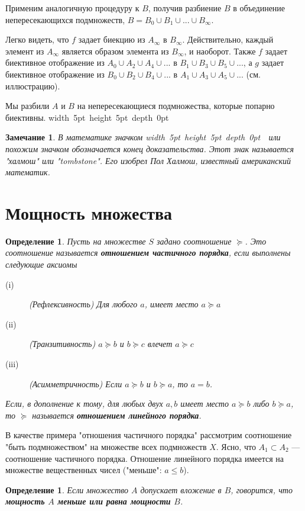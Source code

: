 \documentclass[12pt]{book}
\def\endproof{\hbox{\vrule width 5pt height 5pt depth 0pt}}
\theoremstyle{upshape}
\newtheorem{zadacha}{Задача}[chapter]
\theoremstyle{generic}
\newtheorem{opredelenie}[teorema]{Определение}
\newtheorem{remark}[teorema]{Замечание}
\def\замечание{\begin{remark}}
\def\еза{\end{remark}}
\theoremstyle{upshapenonumber}
\newcommand{\следствие}{%
     \refstepcounter{teorema}
     {\noindent\bf Следствие \thechapter.\arabic{teorema}:\ }}
\newcommand{\пример}{%
     \refstepcounter{teorema}
     {\noindent\bf Пример \thechapter.\arabic{teorema}:\ }}
\newcommand{\лемма}{%
     \refstepcounter{teorema}
     {\noindent\bf Лемма \thechapter.\arabic{teorema}:\ }}
\newcommand{\теорема}{%
     \refstepcounter{teorema}
     {\noindent\bf Теорема \thechapter.\arabic{teorema}:\ }}
\newcommand{\утверждение}{%
     \refstepcounter{teorema}
     {\noindent\bf Утверждение \thechapter.\arabic{teorema}:\ }}
\def\бф{\bf}
\def\ем{\em}
\def\задача{\begin{zadacha}}
\def\ез{\end{zadacha}}
\def\еу{\end{ukazanie}}
\def\определение{\begin{opredelenie}}
\def\ео{\end{opredelenie}}
\def\енум{\begin{enumerate}}
\def\ее{\end{enumerate}}
\begin{document}
Применим аналогичную процедуру к $B$, получив
разбиение $B$ в объединение непересекающихся подмножеств,
$B= B_0 \cup B_1 \cup ... \cup B_\infty$.

Легко видеть, что $f$ задает биекцию из $A_\infty$ в
$B_\infty$. Действительно, каждый элемент из $A_\infty$
является образом элемента из $B_\infty$, и наоборот.
Также $f$ задает биективное отображение
из $A_0 \cup A_2 \cup A_4 \cup ...$ в $B_1 \cup B_3 \cup B_5 \cup ...$,
а $g$ задает биективное отображение из $B_0 \cup B_2 \cup B_4 \cup ...$ 
в $A_1 \cup A_3 \cup A_5 \cup ...$ (см. иллюстрацию). 


Мы разбили $A$ и $B$ на непересекающиеся 
подмножества, которые попарно биективны.
\endproof

\замечание
В математике значком \endproof \ \ или похожим
значком обозначается конец доказательства.
Этот знак называется "халмош" или "tombstone".
Его изобрел Пол Халмош, известный американский математик.
\еза

\section{Мощность множества}

\определение
Пусть на множестве $S$ задано соотношение $\succeq$.
Это соотношение называется {\бф отношением 
частичного порядка}, если выполнены следующие
аксиомы
\begin{description}
\item[(i)] (Рефлексивность) Для любого $a$, имеет место
$a\succeq a$
\item[(ii)] (Транзитивность) $a \succeq b$ и $b\succeq c$ влечет
$a \succeq c$
\item[(iii)] (Асимметричность) Если $a\succeq b$ и $b
\succeq a$, то $a=b$.
\end{description}
Если, в дополнение к тому, для любых двух $a, b$ имеет место
$a\succeq b$ либо $b
\succeq a$, то $\succeq$ называется {\бф отношением
линейного порядка}.
\ео

В качестве примера "отношения частичного порядка" 
рассмотрим соотношение "быть подмножеством" на множестве
всех подмножеств $X$. Ясно, что $A_1\subset A_2$ --- 
соотношение частичного порядка. Отношение
линейного порядка имеется на множестве
вещественных чисел ("меньше": $a\leq b$).

\hfill

\определение
Если множество $A$ допускает вложение в $B$,
говорится, что {\бф мощность $A$ меньше или равна
мощности $B$}. 
\ео
\end{document}
